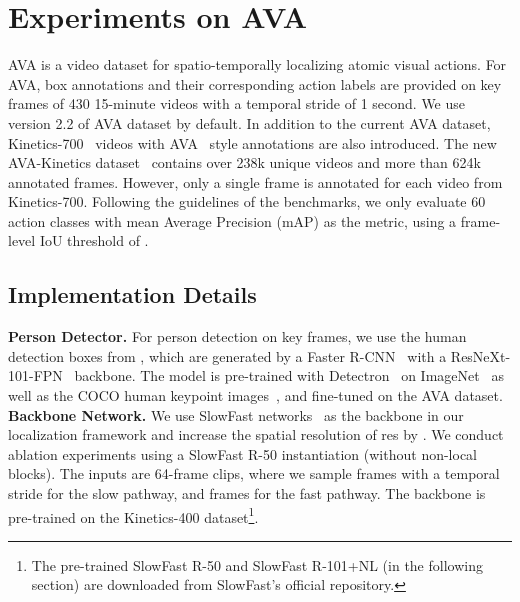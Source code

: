 \section{Experiments on AVA}
\label{sec:Experiments}

AVA \cite{gu2018ava} is a video dataset for spatio-temporally localizing atomic visual actions. For AVA, box annotations and their corresponding action labels are provided on key frames of 430 15-minute videos with a temporal stride of 1 second. We use version 2.2 of AVA dataset by default.
In addition to the current AVA dataset, Kinetics-700~\cite{carreira2019short} videos with AVA~\cite{gu2018ava} style annotations are also introduced. The new AVA-Kinetics dataset~\cite{li2020ava} contains over 238k unique videos and more than 624k annotated frames. However, only a single frame is annotated for each video from Kinetics-700.
Following the guidelines of the benchmarks, we only evaluate 60 action classes with mean Average Precision (mAP) as the metric, using a frame-level IoU threshold of . 






\subsection{Implementation Details}


{\flushleft \bf Person Detector.} For person detection on key frames, we use the human detection boxes from \cite{wu2019long}, which are generated by a Faster R-CNN~\cite{ren2015faster} with a ResNeXt-101-FPN~\cite{xie2017aggregated,lin2017feature} backbone. The model is pre-trained with Detectron~\cite{girshick2018detectron} on ImageNet~\cite{deng2009imagenet} as well as the COCO human keypoint images~\cite{lin2014microsoft}, and fine-tuned on the AVA dataset.
\vspace{-2mm}
{\flushleft \bf Backbone Network.} We use SlowFast networks~\cite{feichtenhofer2019slowfast} as the backbone in our localization framework and increase the spatial resolution of res by . We conduct ablation experiments using a SlowFast R-50  instantiation (without non-local blocks). The inputs are 64-frame clips, where we sample  frames with a temporal stride  for the slow pathway, and  frames for the fast pathway.  The backbone is pre-trained on the Kinetics-400 dataset\footnote{The pre-trained SlowFast R-50 and SlowFast R-101+NL (in the following section) are downloaded from SlowFast's official repository.
}.


